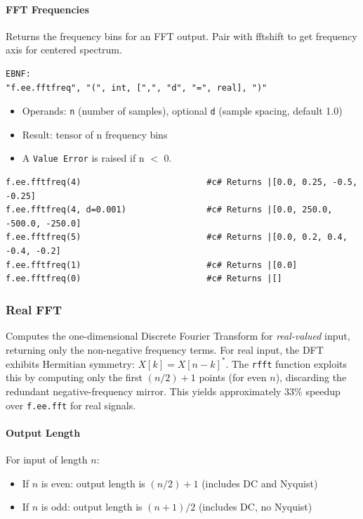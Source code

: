 \paragraph{FFT Frequencies}
Returns the frequency bins for an FFT output. Pair with fftshift to get frequency axis for centered spectrum.
\begin{verbatim}
EBNF:
"f.ee.fftfreq", "(", int, [",", "d", "=", real], ")"
\end{verbatim}
\begin{itemize}
\item Operands: \texttt{n} (number of samples), optional \texttt{d} (sample spacing, default 1.0)
\item Result: tensor of n frequency bins
\item A \texttt{Value Error} is raised if n $<$ 0.
\end{itemize}
\begin{verbatim}
f.ee.fftfreq(4)                         #c# Returns |[0.0, 0.25, -0.5, -0.25]
f.ee.fftfreq(4, d=0.001)                #c# Returns |[0.0, 250.0, -500.0, -250.0]
f.ee.fftfreq(5)                         #c# Returns |[0.0, 0.2, 0.4, -0.4, -0.2]
f.ee.fftfreq(1)                         #c# Returns |[0.0]
f.ee.fftfreq(0)                         #c# Returns |[]
\end{verbatim}

\subsubsection{Real FFT}
\label{sec:rfft}
Computes the one-dimensional Discrete Fourier Transform for \emph{real-valued} input, returning only the non-negative frequency terms. For real input, the DFT exhibits Hermitian symmetry: $X[k] = X[n-k]^*$. The \texttt{rfft} function exploits this by computing only the first $(n/2)+1$ points (for even $n$), discarding the redundant negative-frequency mirror. This yields approximately 33\% speedup over \texttt{f.ee.fft} for real signals.

\paragraph{Output Length}
For input of length $n$:
\begin{itemize}
\item If $n$ is even: output length is $(n/2) + 1$ (includes DC and Nyquist)
\item If $n$ is odd: output length is $(n+1) / 2$ (includes DC, no Nyquist)
\end{itemize}

